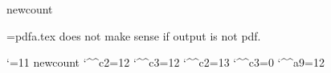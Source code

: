 
\ifx\pdfoutput\undefined \csname newcount\endcsname\pdfoutput \fi

\let\next=\endinput
\ifcase\pdfoutput
 \errhelp={pdfa.tex does not make sense if output is not pdf.}
\else
 \let\next=\relax
\fi
\next


\catcode`\@=11
\ifx\count@@\undefined \csname newcount\endcsname\count@@\fi
\edef\Acircumflexcatcode{\the\catcode`\^^c2}
\edef\Atildecatcode{\the\catcode`\^^c3}
\edef\copyrightcatcode{\the\catcode`\^^a9}
\ifx\Acircumflex\undefined \catcode`\^^c2=12 \def\Acircumflex{^^c2}\fi
\ifx\Atilde\undefined \catcode`\^^c3=12 \def\Atilde{^^c3}\fi
\catcode`\^^c2=13
\catcode`\^^c3=0
\catcode`\^^a9=12 %

\def\@gobble#1{}
\def\hash{\expandafter\@gobble\string\#}
\def\amp{\expandafter\@gobble\string\&}
\def\htmlAmp{\amp\hash x0026;}
\def\htmlCopyright{\amp\hash x00A9;}

\def\dountil#1\continue{\def\body{#1}\reiterate}
\def\reiterate{\body \let\next\relax \else \let\next\reiterate \fi \next}
\let\continue=\fi

\def\allhighother{\count@=128 %
 \loop \catcode\count@=12 \ifnum\count@<255 \advance\count@ by 1\repeat}

\def\utfcatcodes{\allhighother \catcode`\^^c2=13 \catcode`\^^c3=0 }

\ifx\xmpTitle\undefined \let\xmpTitle\jobname \fi
\ifx\xmpAuthor\undefined {}\fi %
\ifx\xmpOrg\undefined \let\xmpOrg\empty \fi
\ifx\xmpOwner\undefined \let\xmpOwner\xmpAuthor \fi %
\ifx\xmpCopyright\undefined \def\xmpCopyright{^^c2^^a9 \xmpOwner\space\the\year}\fi
\ifx\xmpWebStatement\undefined \let\xmpWebStatement\empty \fi
\ifx\xmpCertificate\undefined \let\xmpCertificate\empty \fi
\ifx\xmpUsageTerms\undefined \let\xmpUsageTerms=\xmpCopyright \fi
\ifx\xmpDoi\undefined \let\xmpDoi\empty \fi
\ifx\xmpSubject\undefined \let\xmpSubject\empty \fi
\ifx\xmpKeywords\undefined \let\xmpKeywords\empty \fi %
\ifx\xmpJournaltitle\undefined \let\xmpJournaltitle\empty \fi
\ifx\xmpJournalnumber\undefined \let\xmpJournalnumber\empty \fi
\ifx\xmpVolume\undefined \let\xmpVolume\empty \fi
\ifx\xmpIssue\undefined \let\xmpIssue\empty \fi
\ifx\xmpCoverDate\undefined \let\xmpCoverDate\empty \fi
\ifx\xmpCoverDisplayDate\undefined \let\xmpCoverDisplayDate\empty \fi
\ifx\xmpFirstpage\undefined \let\xmpFirstpage\empty \fi
\ifx\xmpLastpage\undefined \let\xmpLastpage\empty \fi
\ifx\xmpCreator\undefined \def\xmpCreator{TeX}\fi
\ifx\xmpProducer\undefined \def\xmpProducer{pdfTeX}\fi

